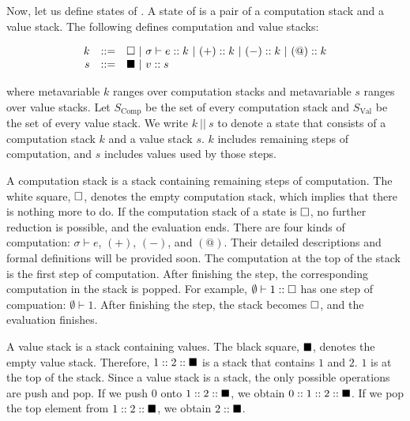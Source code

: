 Now, let us define states of \lang.
A state of \lang is a pair of a computation stack and a value stack.
The following defines computation and value stacks:

\[
\begin{array}{rrl}
k & ::= & \square
  \ |\  \sigma\vdash e:: k
  \ |\  (+):: k
  \ |\  (-):: k
  \ |\  (@):: k \\
s & ::= & \blacksquare
  \ |\ v:: s
\end{array}
\]

where metavariable $k$ ranges over computation stacks and metavariable $s$
ranges over value stacks. Let $S_{\text{Comp}}$ be the set of every
computation stack and $S_{\text{Val}}$ be the set of every value stack.
We write $k\ ||\ s$ to denote a state that consists of
a computation stack $k$ and a value stack $s$. $k$ includes remaining steps
of computation, and $s$ includes values used by those steps.

A computation stack is a stack containing remaining steps of computation.
The white square, $\square$, denotes the empty computation stack, which
implies that there is nothing more to do. If the computation stack of a state is
$\square$, no further reduction is possible, and the evaluation ends.
There are four kinds of computation: $\sigma\vdash e$, $(+)$, $(-)$, and $(@)$.
Their detailed descriptions and formal definitions will be provided soon.
The computation at the top of the stack is the first step of computation. After
finishing the step, the corresponding computation in the stack is popped.
For example, $\emptyset\vdash1::\square$ has one step of compuation:
$\emptyset\vdash1$. After finishing the step, the stack becomes $\square$, and the
evaluation finishes.

A value stack is a stack containing values. The black square, $\blacksquare$, denotes the empty
value stack. Therefore, $1::2::\blacksquare$ is a stack that contains $1$
and $2$. $1$ is at the top of the stack. Since a value stack is a stack, the
only possible operations are push and pop. If we push $0$ onto
$1::2::\blacksquare$, we obtain $0::1::2::\blacksquare$.
If we pop the top element from $1::2::\blacksquare$, we obtain
$2::\blacksquare$.

